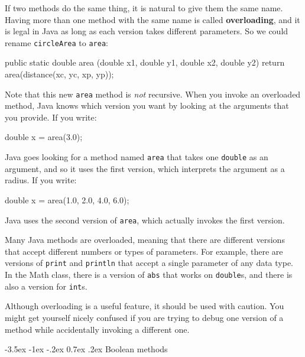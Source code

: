 \documentclass[12pt]{book}
\makeatletter
\theoremstyle{exercise}
\newcommand{\java}[1]{\verb"#1"}
\renewcommand{\section}{\@startsection {section}{1}{\z@}%
    {-3.5ex \@plus -1ex \@minus -.2ex}%
    {0.7ex \@plus.2ex}%
    {\normalfont\Large\bfseries}}
\newcommand{\java}[1]{\lstinline{#1}} %
\makeatother
\begin{document}

If two methods do the same thing, it is natural to give them the same name.
Having more than one method with the same name is called {\bf overloading}, and it is legal in Java as long as each version takes different parameters.
So we could rename \java{circleArea} to \java{area}:

\begin{code}
    public static double area
            (double x1, double y1, double x2, double y2) {
        return area(distance(xc, yc, xp, yp));
    }
\end{code}

Note that this new \java{area} method is {\em not} recursive.
When you invoke an overloaded method, Java knows which version you want by looking at the arguments that you provide.
If you write:

\begin{code}
    double x = area(3.0);
\end{code}

Java goes looking for a method named \java{area} that takes one \java{double} as an argument, and so it uses the first version, which interprets the argument as a radius.
If you write:

\begin{code}
    double x = area(1.0, 2.0, 4.0, 6.0);
\end{code}

Java uses the second version of \java{area}, which
actually invokes the first version.

Many Java methods are overloaded, meaning that there are different versions that accept different numbers or types of parameters.
For example, there are versions of \java{print} and \java{println} that accept a single parameter of any data type.
In the Math class, there is a version of \java{abs} that works on \java{double}s, and there is also a version for \java{int}s.

Although overloading is a useful feature, it should be used with caution.
You might get yourself nicely confused if you are trying to debug one version of a method while accidentally invoking a different one.


\section{Boolean methods}
\label{boolean}

\end{document}
